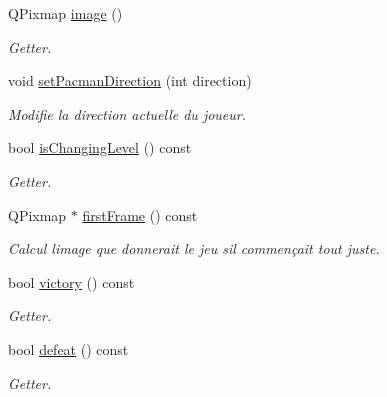 \begin{DoxyCompactItemize}
Q\+Pixmap \hyperlink{class_game_a5de3afc0984fe73c91ab3b4fdef6ef8f}{image} ()
\begin{DoxyCompactList}\small\item\em Getter. \end{DoxyCompactList}\item 
void \hyperlink{class_game_aa9db7117b627f79bac876506fa6733d3}{set\+Pacman\+Direction} (int direction)
\begin{DoxyCompactList}\small\item\em Modifie la direction actuelle du joueur. \end{DoxyCompactList}\item 
bool \hyperlink{class_game_a2cbd90709b9a9924d5c541eb023a7600}{is\+Changing\+Level} () const 
\begin{DoxyCompactList}\small\item\em Getter. \end{DoxyCompactList}\item 
Q\+Pixmap $\ast$ \hyperlink{class_game_abb00a545733e9241b62eedf8e92123d2}{first\+Frame} () const 
\begin{DoxyCompactList}\small\item\em Calcul l\textquotesingle{}image que donnerait le jeu s\textquotesingle{}il commençait tout juste. \end{DoxyCompactList}\item 
bool \hyperlink{class_game_a5cce97ff777796abe02d4b0a4218eb42}{victory} () const 
\begin{DoxyCompactList}\small\item\em Getter. \end{DoxyCompactList}\item 
bool \hyperlink{class_game_a1644c9e27d75c2f4a98e1f5de9f7d66b}{defeat} () const 
\begin{DoxyCompactList}\small\item\em Getter. \end{DoxyCompactList}\end{DoxyCompactItemize}
